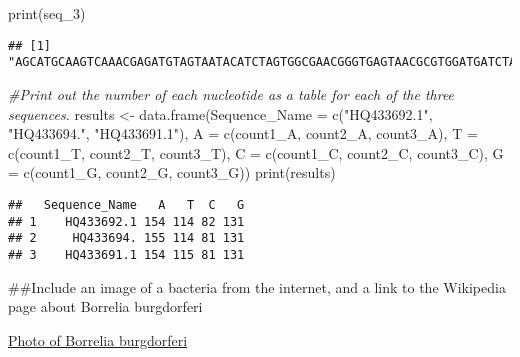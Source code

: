 \documentclass[
]{article}
\newenvironment{Shaded}{\begin{snugshade}}{\end{snugshade}}
\newcommand{\AttributeTok}[1]{\textcolor[rgb]{0.77,0.63,0.00}{#1}}
\newcommand{\CommentTok}[1]{\textcolor[rgb]{0.56,0.35,0.01}{\textit{#1}}}
\newcommand{\FunctionTok}[1]{\textcolor[rgb]{0.00,0.00,0.00}{#1}}
\newcommand{\NormalTok}[1]{#1}
\newcommand{\OtherTok}[1]{\textcolor[rgb]{0.56,0.35,0.01}{#1}}
\newcommand{\StringTok}[1]{\textcolor[rgb]{0.31,0.60,0.02}{#1}}
\begin{document}
\begin{Shaded}
\begin{Highlighting}[]
\FunctionTok{print}\NormalTok{(seq\_3)}
\end{Highlighting}
\end{Shaded}

\begin{verbatim}
## [1] "AGCATGCAAGTCAAACGAGATGTAGTAATACATCTAGTGGCGAACGGGTGAGTAACGCGTGGATGATCTACCTATGAGATGGGGATAACTATTAGAAATAGTAGCTAATACCGAATAAGGTCAATTAATTTGTTAATTGATGAAAGGAAGCCTTTAAAGCTTCGCTTGTAGATGAGTCTGCGTCTTATTAGTTAGTTGGTAGGGTAAATGCCTACCAAGGCGATGATAAGTAACCGGCCTGAGAGGGTGAACGGTCACACTGGAACTGAGACACGGTCCAGACTCCTACGGGAGGCAGCAGCTAAGAATCTTCCGCAATGGGCGAAAGCCTGACGGAGCGACACTGCGTGAATGAAGAAGGTCGAAAGATTGTAAAATTCTTTTATAAATGAGGAATAAGCTTTGTAGGAAATGACGAAGTGATGACGTTAATTTATGAATAAGCCCCGGCTAATTACGTGCCAGCAGCCGCGGTAATACG"
\end{verbatim}

\begin{Shaded}
\begin{Highlighting}[]
\CommentTok{\#Print out the number of each nucleotide as a table for each of the three sequences.}
\NormalTok{results }\OtherTok{\textless{}{-}} \FunctionTok{data.frame}\NormalTok{(}\AttributeTok{Sequence\_Name =} \FunctionTok{c}\NormalTok{(}\StringTok{"HQ433692.1"}\NormalTok{, }\StringTok{"HQ433694."}\NormalTok{, }\StringTok{"HQ433691.1"}\NormalTok{),}
                          \AttributeTok{A =} \FunctionTok{c}\NormalTok{(count1\_A, count2\_A, count3\_A),}
                          \AttributeTok{T =} \FunctionTok{c}\NormalTok{(count1\_T, count2\_T, count3\_T),}
                          \AttributeTok{C =} \FunctionTok{c}\NormalTok{(count1\_C, count2\_C, count3\_C),}
                          \AttributeTok{G =} \FunctionTok{c}\NormalTok{(count1\_G, count2\_G, count3\_G))}
\FunctionTok{print}\NormalTok{(results)}
\end{Highlighting}
\end{Shaded}

\begin{verbatim}
##   Sequence_Name   A   T  C   G
## 1    HQ433692.1 154 114 82 131
## 2     HQ433694. 155 114 81 131
## 3    HQ433691.1 154 115 81 131
\end{verbatim}

\#\#Include an image of a bacteria from the internet, and a link to the
Wikipedia page about Borrelia burgdorferi

\href{PIXNIO-38518-4252x2890.jpeg}{Photo of Borrelia burgdorferi}
\end{document}
